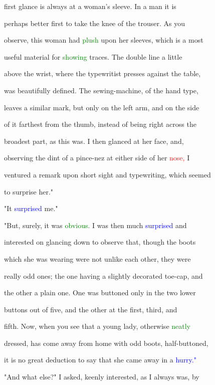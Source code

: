  first glance is always at a woman's sleeve. In a man it is

 perhaps better first to take the knee of the trouser. As you

 observe, this woman had \textcolor{green}{plush} upon her sleeves, which is a most

 useful material for \textcolor{green}{showing} traces. The double line a little

 above the wrist, where the typewritist presses against the table,

 was beautifully defined. The sewing-machine, of the hand type,

 leaves a similar mark, but only on the left arm, and on the side

 of it farthest from the thumb, instead of being right across the

 broadest part, as this was. I then glanced at her face, and,

 observing the dint of a pince-nez at either side of her \textcolor{red}{nose,} I

 ventured a remark upon short sight and typewriting, which seemed

 to \textcolor{BurntOrange}{surprise} her."



 "It \textcolor{blue}{surprised} me."



 "But, surely, it was \textcolor{green}{obvious.} I was then much \textcolor{blue}{surprised} and

 \textcolor{BurntOrange}{interested} on glancing down to observe that, though the boots

 which she was \textcolor{BurntOrange}{wearing} were not unlike each other, they were

 really odd ones; the one having a slightly decorated toe-cap, and

 the other a plain one. One was buttoned only in the two lower

 buttons out of five, and the other at the first, third, and

 fifth. Now, when you see that a \textcolor{BurntOrange}{young} lady, otherwise \textcolor{green}{neatly}

 dressed, has come away from home with odd boots, half-buttoned,

 it is no great deduction to say that she came away in a \textcolor{blue}{hurry."}



 "And what else?" I asked, keenly \textcolor{BurntOrange}{interested,} as I always was, by

